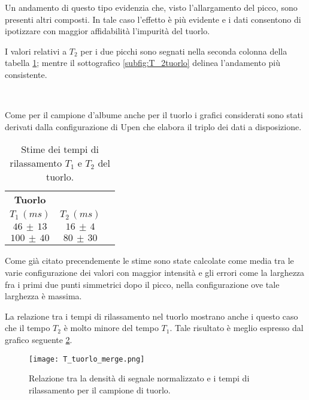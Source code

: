 Un andamento di questo tipo evidenzia che, visto l'allargamento del picco, sono presenti altri composti.
In tale caso l'effetto è più evidente e i dati consentono di ipotizzare con maggior affidabilità l'impurità del tuorlo.

I valori relativi a $T_2$ per i due picchi sono segnati nella seconda colonna della tabella \ref{tab:Tuorlo}; mentre il sottografico \ref{subfig:T_2tuorlo} delinea l'andamento più consistente.

\begin{figure}[h]
\centering
{} \quad
{} \\
\caption{}
\label{fig:T_tuorlo}
\end{figure}

Come per il campione d'albume anche per il tuorlo i grafici considerati sono stati derivati dalla configurazione di Upen che elabora il triplo dei dati a disposizione.

\begin{table}[h]
	\centering
	\begin{tabular}{ccc}
	\toprule
					\textbf{Tuorlo}	\\
		$T_1\,(ms)$ 		& 		$T_2\,(ms)$ 		\\	
	\midrule
		$46\,\pm\,13$		&		$16\,\pm\,4$		\\
		$100\,\pm\,40$		&		$80\,\pm\,30$		\\
	\bottomrule
	\end{tabular}
	\caption{Stime dei tempi di rilassamento $T_1$ e $T_2$ del tuorlo.}	
	\label{tab:Tuorlo}
\end{table}

Come già citato precendemente le stime sono state calcolate come media tra le varie configurazione dei valori con maggior intensità e gli errori come la larghezza fra i primi due punti simmetrici dopo il picco, nella configurazione ove tale larghezza è massima.

La relazione tra i tempi di rilassamento nel tuorlo mostrano anche i questo caso che il tempo $T_2$ è molto minore del tempo $T_1$. 
Tale risultato è meglio espresso dal grafico seguente \ref{fig:Tuorlo}.

\begin{figure}[h]
\centering
\texttt{[image: T\_tuorlo\_merge.png]}
\caption{Relazione tra la densità di segnale normalizzato e i tempi di rilassamento per il campione di tuorlo.}
\label{fig:Tuorlo}
\end{figure}


